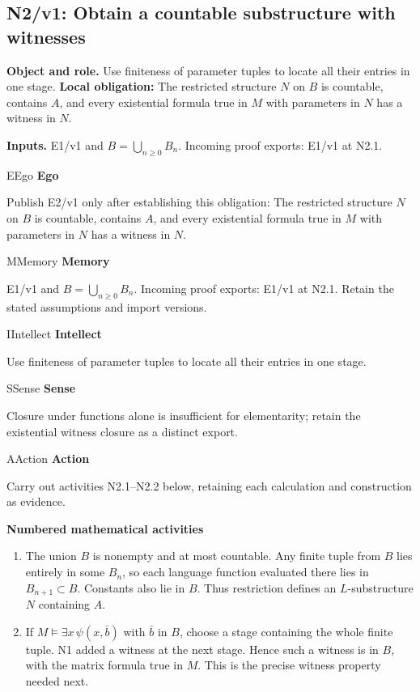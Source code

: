 \documentclass[preprint,12pt,aps,pra,showkeys,amsmath,amssymb,superscriptaddress,floatfix]{revtex4-2}
\theoremstyle{definition}
\theoremstyle{remark}
\newcommand{\mmfaculty}[3]{%
 \begin{mmfacultybox}{#1}{#2}
 {\sffamily\bfseries\color{MMBlue}#2}\par\smallskip #3
 \end{mmfacultybox}}
\newcommand{\field}[2]{\par\smallskip\noindent\textbf{#1.} #2\par}
\begin{document}
\subsection{N2/v1: Obtain a countable substructure with witnesses}

\field{Object and role}{Use finiteness of parameter tuples to locate all their entries in one
stage. \textbf{Local obligation:} The restricted structure \(N\) on
\(B\) is countable, contains \(A\), and every existential formula true
in \(M\) with parameters in \(N\) has a witness in \(N\).}

\field{Inputs}{E1/v1 and \(B=\bigcup_{n\ge0}B_n\). Incoming proof exports: E1/v1 at
N2.1.}

\mmfaculty{E}{Ego}{Publish E2/v1 only after establishing this obligation: The restricted
structure \(N\) on \(B\) is countable, contains \(A\), and every
existential formula true in \(M\) with parameters in \(N\) has a witness
in \(N\).}

\mmfaculty{M}{Memory}{E1/v1 and \(B=\bigcup_{n\ge0}B_n\). Incoming proof exports: E1/v1 at
N2.1. Retain the stated assumptions and import versions.}

\mmfaculty{I}{Intellect}{Use finiteness of parameter tuples to locate all their entries in one
stage.}

\mmfaculty{S}{Sense}{Closure under functions alone is insufficient for elementarity; retain
the existential witness closure as a distinct export.}

\mmfaculty{A}{Action}{Carry out activities N2.1--N2.2 below, retaining each calculation and
construction as evidence.}

\smallskip\noindent\textbf{Numbered mathematical activities}

\begin{enumerate}[label=N2.\arabic*,leftmargin=3.4em]

\item The union \(B\) is nonempty and at most countable. Any finite tuple from
\(B\) lies entirely in some \(B_n\), so each language function evaluated
there lies in \(B_{n+1}\subset B\). Constants also lie in \(B\). Thus
restriction defines an \(L\)-substructure \(N\) containing \(A\).

\item If \(M\models\exists x\,\psi(x,\bar b)\) with \(\bar b\) in \(B\),
choose a stage containing the whole finite tuple. N1 added a witness at
the next stage. Hence such a witness is in \(B\), with the matrix
formula true in \(M\). This is the precise witness property needed next.

\end{enumerate}
\end{document}
